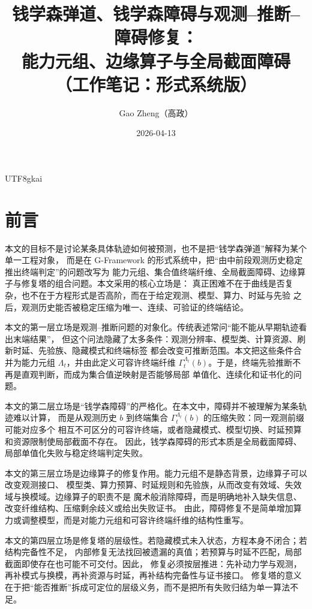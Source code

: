 \documentclass[12pt]{article}
\newcommand{\GFramework}{\textsf{G-Framework}}
\begin{document}
\begin{CJK*}{UTF8}{gkai}

\title{钱学森弹道、钱学森障碍与观测--推断--障碍修复：\\能力元组、边缘算子与全局截面障碍\\（工作笔记：形式系统版）}
\author{Gao Zheng（高政）}
\date{2026-04-13}
\maketitle

\section*{前言}

本文的目标不是讨论某条具体轨迹如何被预测，也不是把“钱学森弹道”解释为某个单一工程对象，
而是在 \GFramework{} 的形式系统中，把“由中前段观测历史稳定推出终端判定”的问题改写为
能力元组、集合值终端纤维、全局截面障碍、边缘算子与修复塔的组合问题。本文采用的核心立场是：
真正困难不在于曲线是否复杂，也不在于方程形式是否高阶，而在于给定观测、模型、算力、时延与先验
之后，观测历史能否被稳定压缩为唯一、连续、可验证的终端结论。

本文的第一层立场是观测--推断问题的对象化。传统表述常问“能不能从早期轨迹看出末端结果”，
但这个问法隐藏了太多条件：观测分辨率、模型类、计算资源、刷新时延、先验族、隐藏模式和终端标签
都会改变可推断范围。本文把这些条件合并为能力元组 \(\Lambda_t\)，并由此定义可容许终端纤维
\(\Gamma_t^{\Lambda_t}(b)\)。于是，终端先验推断不再是直观判断，而成为集合值逆映射是否能够局部
单值化、连续化和证书化的问题。

本文的第二层立场是“钱学森障碍”的严格化。在本文中，障碍并不被理解为某条轨迹难以计算，
而是从观测历史 \(b\) 到终端集合 \(\Gamma_t^{\Lambda_t}(b)\) 的压缩失败：同一观测前缀可能对应多个
相互不可区分的可容许终端，或者隐藏模式、模型切换、时延预算和资源限制使局部截面不存在。
因此，钱学森障碍的形式本质是全局截面障碍、局部单值化失败与稳定终端判定失败。

本文的第三层立场是边缘算子的修复作用。能力元组不是静态背景，边缘算子可以改变观测接口、
模型类、算力预算、时延规则和先验族，从而改变有效域、失效域与换模域。边缘算子的职责不是
魔术般消除障碍，而是明确地补入缺失信息、改变纤维结构、压缩剩余歧义或给出失败证书。
由此，障碍修复不是简单增加算力或调整模型，而是对能力元组和可容许终端纤维的结构性重写。

本文的第四层立场是修复塔的层级性。若隐藏模式未入状态，方程本身不闭合；若结构完备性不足，
内部修复无法找回被遗漏的真值；若预算与时延不匹配，局部截面即使存在也可能不可交付。因此，
修复必须按层推进：先补动力学与观测，再补模式与换模，再补资源与时延，再补结构完备性与证书接口。
修复塔的意义在于把“能否推断”拆成可定位的层级义务，而不是把所有失败归结为单一算法不足。


\end{CJK*}
\end{document}
